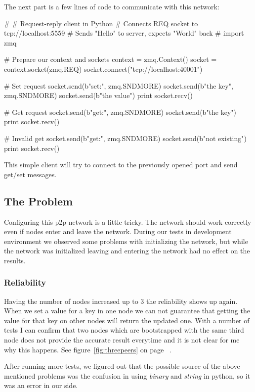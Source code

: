 The next part is a few lines of code to communicate with this network:

\begin{python}
#
# Request-reply client in Python
# Connects REQ socket to tcp://localhost:5559
# Sends "Hello" to server, expects "World" back
#
import zmq

# Prepare our context and sockets
context = zmq.Context()
socket = context.socket(zmq.REQ)
socket.connect("tcp://localhost:40001")

# Set request
socket.send(b"set:", zmq.SNDMORE)
socket.send(b"the key", zmq.SNDMORE)
socket.send(b"the value")
print socket.recv()

# Get request
socket.send(b"get:", zmq.SNDMORE)
socket.send(b"the key")
print socket.recv()

# Invalid get
socket.send(b"get:", zmq.SNDMORE)
socket.send(b"not existing")
print socket.recv()
\end{python}

This simple client will try to connect to the previously opened port and send get/set messages.

\subsection{The Problem}
Configuring this p2p network is a little tricky. The network should work correctly even if nodes enter and leave the network. During our tests in development environment we observed some problems with initializing the network, but while the network was initialized leaving and entering the network had no effect on the results.

\subsubsection{Reliability}
Having the number of nodes increased up to 3 the reliability shows up again. When we set a value for a key in one node we can not guarantee that getting the value for that key on other nodes will return the updated one. With a number of tests I can confirm that two nodes which are bootstrapped with the same third node does not provide the accurate result everytime and it is not clear for me why this happens. See figure~\ref{fig:threepeers} on page ~\pageref{fig:threepeers}.

After running more tests, we figured out that the possible source of the above mentioned problems was the confusion in using \textit{binary} and \textit{string} in python, so it was an error in our side.

